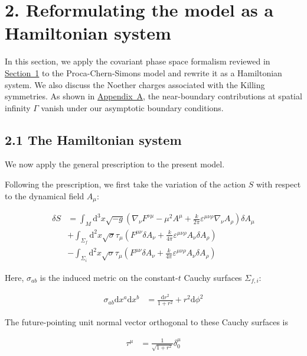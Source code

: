 \section{2. Reformulating the model as a Hamiltonian system}\label{sec:hamiltonian-and-symmetries}

In this section, we apply the covariant phase space formalism reviewed in \hyperref[sec:proca-cs-global-ads3]{Section~1} to the Proca-Chern-Simons model and rewrite it as a Hamiltonian system. We also discuss the Noether charges associated with the Killing symmetries. As shown in \hyperref[app:near-boundary-contributions]{Appendix~A}, the near-boundary contributions at spatial infinity $\Gamma$ vanish under our asymptotic boundary conditions.

\subsection{2.1 The Hamiltonian system}\label{subsec:hamiltonian-system}

We now apply the general prescription to the present model.

Following the prescription, we first take the variation of the action $S$ with respect to the dynamical field $A_\mu$:

\begin{align}
\delta S & =\int _{M}\mathrm{d}^{3}x\sqrt{ -g }\left( \nabla _{\nu}F^{\nu \mu}-\mu ^{2}A^{\mu}+\frac{k}{2\pi}\varepsilon ^{\mu \nu \rho}\nabla _{\nu}A_{\rho}\right)\delta A_{\mu} \\
 & +\int _{\Sigma _{f}}\mathrm{d}^{2}x\sqrt{ \sigma }\tau _{\mu}\left(F^{\mu \nu}\delta A_{\nu}+\frac{k}{4\pi}\varepsilon ^{\mu \nu \rho}A_{\nu}\delta A_{\rho}\right) \\
 & -\int _{\Sigma _{i}}\mathrm{d}^{2}x\sqrt{ \sigma }\tau _{\mu}\left(F^{\mu \nu}\delta A_{\nu}+\frac{k}{4\pi}\varepsilon ^{\mu \nu \rho}A_{\nu}\delta A_{\rho}\right)
\end{align}

Here, $\sigma_{ab}$ is the induced metric on the constant-$t$ Cauchy surfaces $\Sigma_{f,i}$:

\begin{align}
\sigma _{ab}\mathrm{d}x^{a}\mathrm{d}x^{b} & =\frac{\mathrm{d}r^{2}}{1+r^{2}}+r^{2}\mathrm{d}\phi ^{2}
\end{align}

The future-pointing unit normal vector orthogonal to these Cauchy surfaces is

\begin{align}
\tau ^{\mu} & =\frac{1}{\sqrt{ 1+r^{2} }}\delta _{0}^{\mu}
\end{align}

